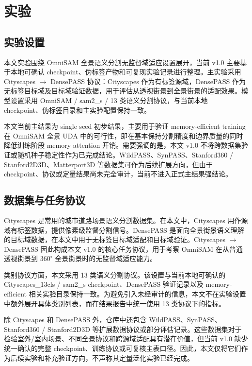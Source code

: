 \section{实验}
\label{sec:experiments}

\subsection{实验设置}
本文实验围绕 OmniSAM 全景语义分割无监督域适应设置展开，当前 v1.0 主要基于本地可确认 checkpoint、伪标签产物和可复现实验记录进行整理。主实验采用 Cityscapes $\rightarrow$ DensePASS 协议：Cityscapes 作为有标签源域，DensePASS 作为无标签目标域及目标域验证数据，用于评估从透视街景到全景街景的适配效果。模型设置采用 OmniSAM / sam2\_s / 13 类语义分割协议，与当前本地 checkpoint、伪标签目录和主实验配置保持一致。

本文当前主结果为 single seed 初步结果，主要用于验证 memory-efficient training 在 OmniSAM 全景 UDA 中的可行性，即在基本保持分割精度和边界质量的同时降低训练阶段 memory attention 开销。需要强调的是，本文 v1.0 不将跨数据集验证或随机种子稳定性作为已完成结论。WildPASS、SynPASS、Stanford360 / Stanford2D3D、Matterport3D 等数据集可作为后续扩展方向，但由于 checkpoint、协议或定量结果尚未完全审计，当前不进入正式主结果强结论。

\subsection{数据集与任务协议}
Cityscapes 是常用的城市道路场景语义分割数据集。在本文中，Cityscapes 用作源域有标签数据，提供像素级监督分割信号。DensePASS 是面向全景街景语义理解的目标域数据，在本文中用于无标签目标域适配和目标域验证。Cityscapes $\rightarrow$ DensePASS 因此构成本文 v1.0 的核心任务协议，用于考察 OmniSAM 在从普通透视街景到 $360^\circ$ 全景街景时的无监督域适应能力。

类别协议方面，本文采用 13 类语义分割协议。该设置与当前本地可确认的 Cityscapes\_13cls / sam2\_s checkpoint、DensePASS 验证记录以及 memory-efficient 相关实验目录保持一致。为避免引入未经审计的信息，本文不在实验设置中额外展开具体类别列表，而在结果报告中统一使用 13 类协议下的指标。

除 Cityscapes 和 DensePASS 外，仓库中还包含 WildPASS、SynPASS、Stanford360 / Stanford2D3D 等扩展数据协议或部分评估记录。这些数据集对于检验室外/室内场景、不同全景协议和跨源域适配具有潜在价值，但当前 v1.0 缺少统一确认的完整 checkpoint、训练协议或可复核主表口径。因此，本文仅将它们作为后续实验和补充验证方向，不声称其定量泛化实验已经完成。

